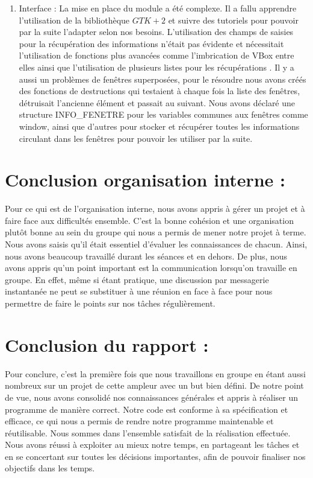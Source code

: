 \documentclass{article}
\begin{document}
\begin{enumerate}
			\item Interface :
			 La mise en place du module a été complexe. Il a fallu apprendre l'utilisation de la bibliothèque $GTK+2$ et suivre des tutoriels pour pouvoir par la suite l'adapter selon nos besoins.  L'utilisation des champs de saisies  pour la récupération des informations n'était pas évidente et nécessitait l'utilisation de fonctions plus avancées comme l'imbrication de VBox entre elles ainsi que l'utilisation de plusieurs listes pour les récupérations . 
Il y a aussi un problèmes de fenêtres superposées,  pour le résoudre nous avons créés des fonctions de destructions qui testaient à chaque fois la liste des fenêtres, détruisait l'ancienne élément et passait au suivant.
Nous avons déclaré une structure INFO\_FENETRE pour les variables communes aux fenêtres comme window, ainsi que d'autres pour stocker et récupérer toutes les informations circulant dans les fenêtres pour pouvoir les utiliser par la suite.      
	\end{enumerate}

\section{Conclusion organisation interne :}
Pour ce qui est de l'organisation interne, nous avons appris à gérer un projet et à faire face aux difficultés ensemble. C'est la bonne cohésion et une organisation plutôt bonne au sein du groupe  qui nous a permis de mener notre projet à terme. 
Nous avons saisis qu'il était essentiel d'évaluer les connaissances de chacun. Ainsi, nous avons beaucoup travaillé durant les séances et en dehors.  De plus, nous avons appris qu'un point important est la communication lorsqu'on travaille en groupe. En effet, même si étant pratique, une discussion par messagerie instantanée ne peut se substituer à une réunion en face à face pour nous permettre de faire le points sur nos tâches régulièrement. 

\section{Conclusion du rapport :}
Pour conclure, c'est la première fois que nous travaillons en groupe en étant aussi nombreux sur un projet de cette ampleur avec un but bien défini. De notre point de vue, nous avons consolidé nos connaissances générales et appris à réaliser un programme de manière correct. 
Notre code est conforme à sa spécification et efficace, ce qui nous a permis de rendre notre programme maintenable et réutilisable. 
Nous sommes dans l'ensemble satisfait de la réalisation effectuée. Nous avons réussi à exploiter au mieux notre temps, en partageant les tâches et en se concertant sur toutes les décisions importantes, afin de pouvoir finaliser nos objectifs dans les temps.
\end{document}

